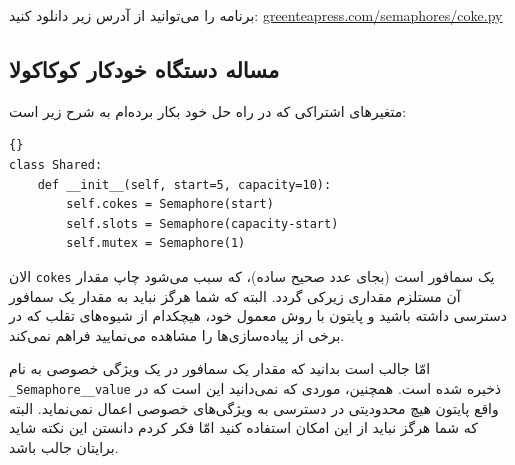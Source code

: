 \documentclass{book}
\newcommand{\clearemptydoublepage}{\newpage\cleardoublepage}
\begin{document}
    برنامه را می‌توانید از آدرس زیر دانلود کنید:
\url{greenteapress.com/semaphores/coke.py}


\clearemptydoublepage
\subsection {مساله دستگاه خودکار کوکاکولا}

    متغیرهای اشتراکی که در راه حل خود بکار برده‌ام به شرح زیر است:

\begin{latin}
\begin{lstlisting}[title={}]{}
class Shared:
    def __init__(self, start=5, capacity=10):
        self.cokes = Semaphore(start)
        self.slots = Semaphore(capacity-start)
        self.mutex = Semaphore(1)
\end{lstlisting}
\end{latin}

    الان {\tt cokes} یک سمافور است (بجای عدد صحیح ساده)، که سبب می‌شود چاپ مقدار آن مستلزم مقداری زیرکی گردد. 
    البته که  شما هرگز نباید به مقدار یک سمافور دسترسی داشته باشید و پایتون با روش معمول خود، هیچکدام از شیوه‌های تقلب که در برخی از پیاده‌سازی‌ها را 
    مشاهده می‌نمایید  فراهم نمی‌کند. 

    امّا جالب است بدانید که مقدار یک سمافور در یک ویژگی خصوصی به نام {\tt \_Semaphore\_\_value} ذخیره شده است. 
    همچنین، موردی که نمی‌دانید این است که در واقع پایتون هیچ محدودیتی در دسترسی به ویژگی‌های خصوصی اعمال نمی‌نماید. 
    البته که شما هرگز نباید از این امکان استفاده کنید امّا فکر کردم دانستن این نکته شاید برایتان جالب باشد. 

\end{document}
